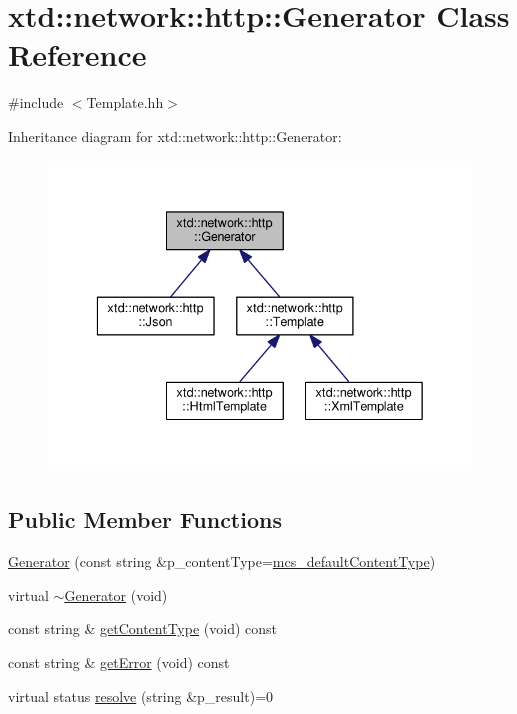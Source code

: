 \hypertarget{classxtd_1_1network_1_1http_1_1Generator}{\section{xtd\-:\-:network\-:\-:http\-:\-:Generator Class Reference}
\label{classxtd_1_1network_1_1http_1_1Generator}
}


{\ttfamily \#include $<$Template.\-hh$>$}



Inheritance diagram for xtd\-:\-:network\-:\-:http\-:\-:Generator\-:
\nopagebreak
\begin{figure}[H]
\begin{center}
\leavevmode
\includegraphics[width=338pt]{classxtd_1_1network_1_1http_1_1Generator__inherit__graph}
\end{center}
\end{figure}
\subsection*{Public Member Functions}
\begin{DoxyCompactItemize}
\item 
\hyperlink{classxtd_1_1network_1_1http_1_1Generator_a5f8bfffa6c7fe8ae46158e976af3d666}{Generator} (const string \&p\-\_\-content\-Type=\hyperlink{classxtd_1_1network_1_1http_1_1Generator_aef564fc3152e7477bb429e45b19328fc}{mcs\-\_\-default\-Content\-Type})
\item 
virtual \hyperlink{classxtd_1_1network_1_1http_1_1Generator_a1d1e0656a6ffeecd718230613681c56d}{$\sim$\-Generator} (void)
\item 
const string \& \hyperlink{classxtd_1_1network_1_1http_1_1Generator_a4052d01b0d4849321b61688eac757b41}{get\-Content\-Type} (void) const 
\item 
const string \& \hyperlink{classxtd_1_1network_1_1http_1_1Generator_ac4fa462833bedc8bde7c7e81b1a29f37}{get\-Error} (void) const 
\item 
virtual status \hyperlink{classxtd_1_1network_1_1http_1_1Generator_a20ee788dc76ee76f4be5f44091b655ca}{resolve} (string \&p\-\_\-result)=0
\end{DoxyCompactItemize}
